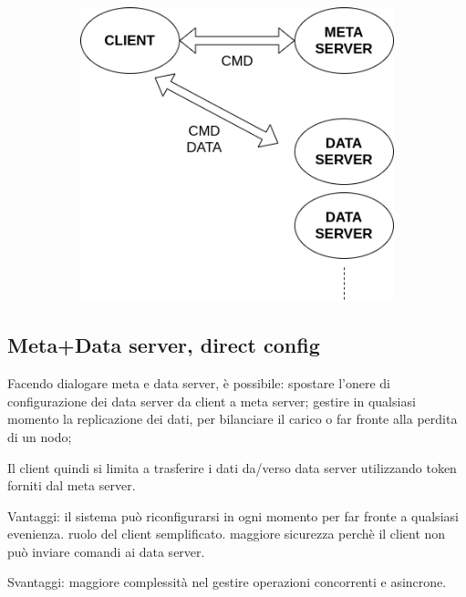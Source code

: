 \documentclass{article}
\begin{document}
\begin{figure}[H]
	\centering
	\begin{subfigure}{0.80\linewidth}
		\includegraphics[width=\linewidth]{../diagrams/architettura/5.png}
	\end{subfigure}
\end{figure}



\subsection{Meta+Data server, direct config}

Facendo dialogare meta e data server, è possibile:
spostare l'onere di configurazione dei data server da client a meta server;
gestire in qualsiasi momento la replicazione dei dati, per bilanciare il carico o far fronte alla perdita di un nodo;

Il client quindi si limita a trasferire i dati da/verso data server utilizzando token forniti dal meta server. 

Vantaggi: il sistema può riconfigurarsi in ogni momento per far fronte a qualsiasi evenienza. ruolo del client semplificato. maggiore sicurezza perchè il client non può inviare comandi ai data server.

Svantaggi: maggiore complessità nel gestire operazioni concorrenti e asincrone. 
\end{document}
